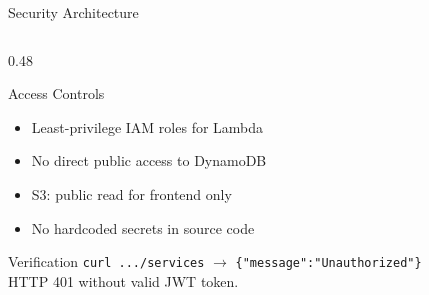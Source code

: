 \documentclass[aspectratio=169,11pt]{beamer}
\begin{document}
\begin{frame}[shrink=11]{Security Architecture}
\begin{columns}[T]
\begin{column}{0.48\textwidth}
\vspace{0.3em}
\begin{block}{Access Controls}
{\small
\begin{itemize}
    \item Least-privilege IAM roles for Lambda
    \item No direct public access to DynamoDB
    \item S3: public read for frontend only
    \item No hardcoded secrets in source code
\end{itemize}
}
\end{block}

\vspace{0.3em}
\begin{alertblock}{Verification}
{\footnotesize
\texttt{curl .../services} $\rightarrow$ \texttt{\{"message":"Unauthorized"\}}\\
HTTP 401 without valid JWT token.
}
\end{alertblock}
\end{column}
\end{columns}
\end{frame}
\end{document}
